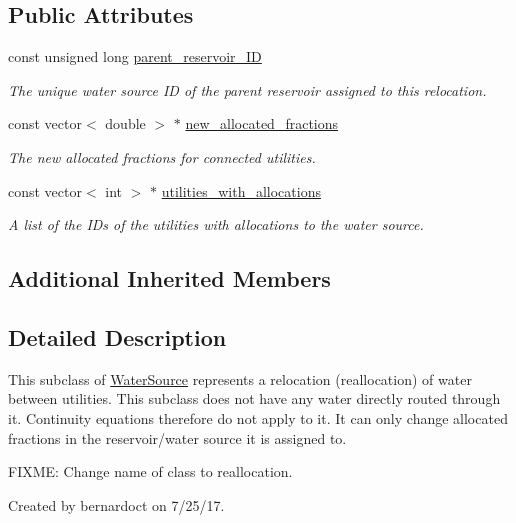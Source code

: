 \subsection*{Public Attributes}
\begin{DoxyCompactItemize}
\item 
const unsigned long \mbox{\hyperlink{classRelocation_a61282254064f00641aaec667a7eb0652}{parent\+\_\+reservoir\+\_\+\+ID}}
\begin{DoxyCompactList}\small\item\em The unique water source ID of the parent reservoir assigned to this relocation. \end{DoxyCompactList}\item 
const vector$<$ double $>$ $\ast$ \mbox{\hyperlink{classRelocation_acc95d1be560fed2b4a1b4b2ae605ae67}{new\+\_\+allocated\+\_\+fractions}}
\begin{DoxyCompactList}\small\item\em The new allocated fractions for connected utilities. \end{DoxyCompactList}\item 
const vector$<$ int $>$ $\ast$ \mbox{\hyperlink{classRelocation_ae426f390487b6b67f19bfbf556c922c2}{utilities\+\_\+with\+\_\+allocations}}
\begin{DoxyCompactList}\small\item\em A list of the I\+Ds of the utilities with allocations to the water source. \end{DoxyCompactList}\end{DoxyCompactItemize}
\subsection*{Additional Inherited Members}


\subsection{Detailed Description}
This subclass of {\ttfamily \mbox{\hyperlink{classWaterSource}{Water\+Source}}} represents a relocation (reallocation) of water between utilities. This subclass does not have any water directly routed through it. Continuity equations therefore do not apply to it. It can only change allocated fractions in the reservoir/water source it is assigned to. 

F\+I\+X\+ME\+: Change name of class to reallocation.

Created by bernardoct on 7/25/17. 

